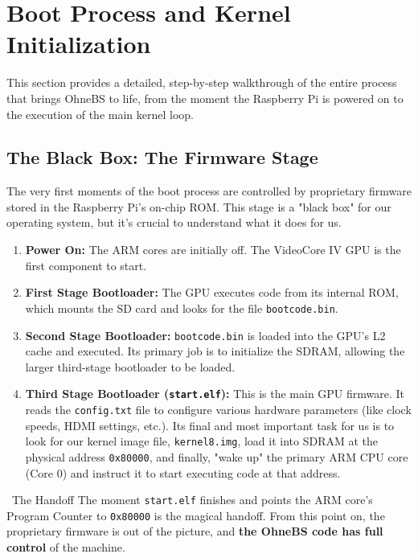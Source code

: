 \documentclass[a4paper, 11pt]{article}
\begin{document}
	
	\newpage
	\section{Boot Process and Kernel Initialization}
	This section provides a detailed, step-by-step walkthrough of the entire process that brings OhneBS to life, from the moment the Raspberry Pi is powered on to the execution of the main kernel loop.
	
	\subsection{The Black Box: The Firmware Stage}
	The very first moments of the boot process are controlled by proprietary firmware stored in the Raspberry Pi's on-chip ROM. This stage is a "black box" for our operating system, but it's crucial to understand what it does for us.
	\begin{enumerate}
		\item \textbf{Power On:} The ARM cores are initially off. The VideoCore IV GPU is the first component to start.
		\item \textbf{First Stage Bootloader:} The GPU executes code from its internal ROM, which mounts the SD card and looks for the file \texttt{bootcode.bin}.
		\item \textbf{Second Stage Bootloader:} \texttt{bootcode.bin} is loaded into the GPU's L2 cache and executed. Its primary job is to initialize the SDRAM, allowing the larger third-stage bootloader to be loaded.
		\item \textbf{Third Stage Bootloader (\texttt{start.elf}):} This is the main GPU firmware. It reads the \texttt{config.txt} file to configure various hardware parameters (like clock speeds, HDMI settings, etc.). Its final and most important task for us is to look for our kernel image file, \texttt{kernel8.img}, load it into SDRAM at the physical address \texttt{0x80000}, and finally, "wake up" the primary ARM CPU core (Core 0) and instruct it to start executing code at that address.
	\end{enumerate}
	
	\begin{infobox}{\faKey\ The Handoff}
		The moment \texttt{start.elf} finishes and points the ARM core's Program Counter to \texttt{0x80000} is the magical handoff. From this point on, the proprietary firmware is out of the picture, and \textbf{the OhneBS code has full control} of the machine.
	\end{infobox}
	
\end{document}
